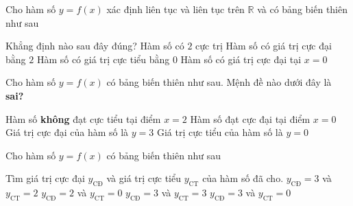 \begin{ex}%
	Cho hàm số $y=f(x)$ xác định liên tục và liên tục trên $\mathbb{R}$ và có bảng biến thiên như sau
	\begin{center}
	\end{center}
		Khẳng định nào sau đây đúng?
		\choice
			{Hàm số có $2$ cực trị}
			{Hàm số có giá trị cực đại bằng $2$}
			{\True Hàm số có giá trị cực tiểu bằng $0$}
			{Hàm số có giá trị cực đại tại $x=0$}
\end{ex}

\begin{ex}%
	Cho hàm số $y=f(x)$ có bảng biến thiên như sau.
	Mệnh đề nào dưới đây là \textbf{sai?}
	\begin{center}
	\end{center}
		\choice
			{\True Hàm số \textbf{không} đạt cực tiểu tại điểm $x=2$}
			{Hàm số đạt cực đại tại điểm $x=0$}
			{Giá trị cực đại của hàm số là $y=3$}
			{Giá trị cực tiểu của hàm số là $y=0$}
\end{ex}

\begin{ex}%
	Cho hàm số $y=f(x)$ có bảng biến thiên như sau
	\begin{center}
	\end{center}
		Tìm giá trị cực đại $y_{\text{CĐ}}$ và giá trị cực tiểu $y_{\text{CT}}$ của hàm số đã cho.
		\choice
			{$y_{\text{CĐ}}=3$ và $y_{\text{CT}}=2$}
			{$y_{\text{CĐ}}=2$ và $y_{\text{CT}}=0$}
			{$y_{\text{CĐ}}=3$ và $y_{\text{CT}}=3$}
			{\True $y_{\text{CĐ}}=3$ và $y_{\text{CT}}=0$}
\end{ex}

